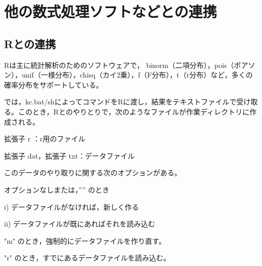 \documentclass[papersize,a4paper,12pt,uplatex]{jsarticle}
\begin{document}
\newpage

\section{他の数式処理ソフトなどとの連携}
\subsection{Rとの連携}
Rは主に統計解析のためのソフトウェアで，  binorm（二項分布），pois（ポアソン），unif（一様分布），chisq（カイ2乗），f（F分布），t（t分布）など，多くの確率分布をサポートしている。

  \ketcindy では，kc.bat/shによってコマンドをRに渡し，結果をテキストファイルで受け取る。このとき，Rとのやりとりで，次のようなファイルが作業ディレクトリに作成される。
  
拡張子 r ：r用のファイル

拡張子 dat，拡張子 txt：データファイル

このデータのやり取りに関する次のオプションがある。

  オプションなしまたは，”” のとき
  
    i) データファイルがなければ，新しく作る
    
    ii) データファイルが既にあればそれを読み込む
    
  "m"  のとき，強制的にデータファイルを作り直す。
  
  "r" のとき，すでにあるデータファイルを読み込む。
  
\end{document}
